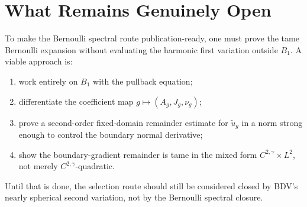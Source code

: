 \documentclass[11pt]{article}
\theoremstyle{definition}
\begin{document}
\section{What Remains Genuinely Open}

To make the Bernoulli spectral route publication-ready, one must prove the
tame Bernoulli expansion without evaluating the harmonic first variation
outside \(B_1\). A viable approach is:
\begin{enumerate}
\item work entirely on \(B_1\) with the pullback equation;
\item differentiate the coefficient map \(g\mapsto(A_g,J_g,\nu_g)\);
\item prove a second-order fixed-domain remainder estimate for
\(\widetilde u_g\) in a norm strong enough to control the boundary normal
derivative;
\item show the boundary-gradient remainder is tame in the mixed form
\(C^{2,\gamma}\times L^2\), not merely \(C^{2,\gamma}\)-quadratic.
\end{enumerate}
Until that is done, the selection route should still be considered closed by
BDV's nearly spherical second variation, not by the Bernoulli spectral closure.
\end{document}
